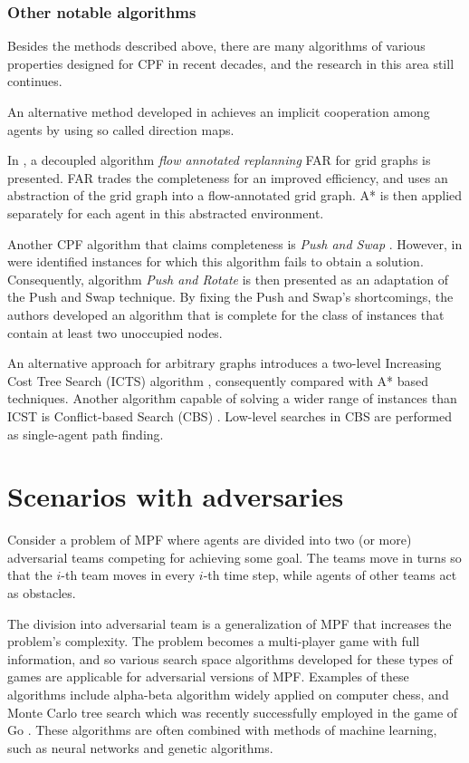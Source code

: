 \subsubsection{Other notable algorithms}

Besides the methods described above, there are many algorithms of various properties designed for CPF in recent decades, and the research in this area still continues. 

An alternative method developed in \cite{jansen08} achieves an implicit cooperation among agents by using so called direction maps.

In \cite{wang08}, a decoupled algorithm \emph{flow annotated replanning} FAR for grid graphs is presented.
FAR trades the completeness for an improved efficiency, and uses an abstraction of the grid graph into a flow-annotated grid graph.
A* is then applied separately for each agent in this abstracted environment.

Another CPF algorithm that claims completeness is \emph{Push and Swap} \cite{luna11}. 
However, in \cite{wilde13} were identified instances for which this algorithm fails to obtain a solution.
Consequently, algorithm \emph{Push and Rotate} is then presented as an adaptation of the Push and Swap technique. 
By fixing the Push and Swap’s shortcomings, the authors developed an algorithm that is complete for the class of instances that contain at least two unoccupied nodes.

An alternative approach for arbitrary graphs introduces a two-level Increasing Cost Tree Search (ICTS) algorithm \cite{sharon13}, consequently compared with A* based techniques. 
Another algorithm capable of solving a wider range of instances than ICST is Conflict-based Search (CBS) \cite{sharon13}. 
Low-level searches in CBS are performed as single-agent path finding.
\section{Scenarios with adversaries}

Consider a problem of MPF where agents are divided into two (or more) adversarial teams competing for achieving some goal.
The teams move in turns so that the $i$-th team moves in every $i$-th time step, while agents of other teams act as obstacles.

The division into adversarial team is a generalization of MPF that increases the problem's complexity.
The problem becomes a multi-player game with full information, and so various search space algorithms developed for these types of games are applicable for adversarial versions of MPF.
Examples of these algorithms include alpha-beta algorithm widely applied on computer chess, and Monte Carlo tree search which was recently successfully employed in the game of Go \cite{silver16}.
These algorithms are often combined with methods of machine learning, such as neural networks and genetic algorithms.


